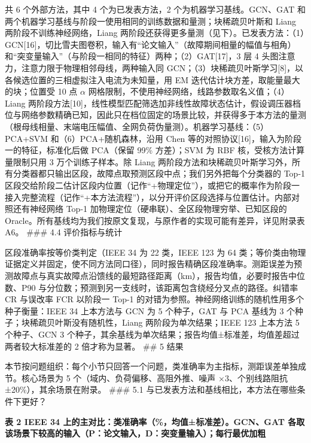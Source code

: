 \documentclass[
  11pt,
]{ctexart}
\begin{document}
共 6 个外部方法，其中 4 个为已发表方法，2 个为机器学习基线。GCN、GAT
和两个机器学习基线与阶段一使用相同的训练数据和量测；块稀疏贝叶斯和 Liang
两阶段不训练神经网络，Liang
两阶段还获得更多量测（见下）。已发表方法：（1）GCN{[}16{]}，切比雪夫图卷积，输入有``论文输入''（故障期间相量的幅值与相角）和``突变量输入''（与阶段一相同的特征）两种；（2）GAT{[}17{]}，3
层 4 头图注意力，注意力限于物理相邻母线，两种输入同
GCN；（3）块稀疏贝叶斯学习{[}8{]}，以各候选位置的三相虚拟注入电流为未知量，用
EM 迭代估计块方差，取能量最大的块；位置受 10 点 \(\alpha\)
网格限制，不使用神经网络，线路参数取名义值；（4）Liang
两阶段方法{[}10{]}，线性模型匹配筛选加非线性故障状态估计，假设调压器档位与网络参数精确已知，因此只在档位固定的场景比较，并获得多于本方法的量测（根母线相量、末端电压幅值、全网负荷伪量测）。机器学习基线：（5）PCA+SVM
和（6）PCA+随机森林，沿用 Chen
等的对照协议{[}16{]}，输入为阶段一的特征，标准化后做 PCA（保留 99\%
方差）；SVM 为 RBF 核，受核方法计算量限制只用 3 万个训练子样本。除 Liang
两阶段方法和块稀疏贝叶斯学习外，所有分类器都只输出区段，故障点取预测区段中点；我们另外把每个分类器的
Top-1
区段交给阶段二估计区段内位置（记作``+物理定位''），或把它的概率作为阶段一接入完整流程（记作``+本方法流程''），以分开评价区段选择与位置估计。内部对照还有神经网络
Top-1 加物理定位（硬串联）、全区段物理穷举、已知区段的
Oracle。所有基线均为我们按原文复现，与原作者的实现可能有差异，详见附录表
A6。 \#\#\# 4.4 评价指标与统计

区段准确率按等价类判定（IEEE 34 为 22 类，IEEE 123 为 64
类；等价类由物理证据定义并固定，使不同方法同口径），同时报告精确区段准确率。测距误差为预测故障点与真实故障点沿馈线的最短路径距离（km），报告均值，必要时报告中位数、P90
与分位数；预测到另一支线时，该距离包含绕经分叉点的路径。纠错率 CR
与误改率 FCR 以阶段一 Top-1
的对错为参照。神经网络训练的随机性用多个种子衡量：IEEE 34 上本方法与 GCN
为 5 个种子，GAT 与 PCA 基线为 3 个种子；块稀疏贝叶斯没有随机性，Liang
两阶段为单次结果；IEEE 123 上本方法 5 个种子、GCN 3
个种子，其余基线为单次结果；报告均值±标准差，均值差超过两者较大标准差的
2 倍才称为显著。 \#\# 5 结果

本节按问题组织：每个小节只回答一个问题，类准确率为主指标，测距误差单独成节。核心场景为
5 个（域内、负荷偏移、高阻外推、噪声 ×3、个别线路阻抗
±20\%），其余场景在附录。 \#\#\# 5.1
与已发表方法和基线相比，本方法在哪些条件下更好？

\textbf{表 2 IEEE 34 上的主对比：类准确率（\%，均值±标准差）。GCN、GAT
各取该场景下较高的输入（P：论文输入，D：突变量输入）；每行最优加粗}
\end{document}
